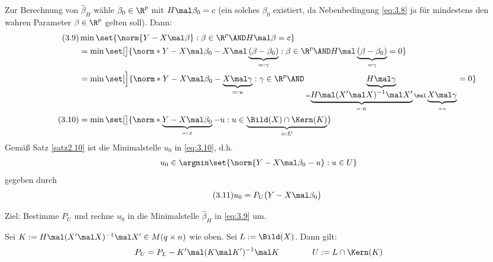 Zur Berechnung von $\hat{\beta}_H$ wähle $\beta_0\in\R^p$ mit $H\mal\beta_0=c$ (ein solches $\beta_0$ existiert, da Nebenbedingung \eqref{eq:3.8} ja für mindestens den wahren Parameter $\beta\in\R^p$ gelten soll).
Dann:
\begin{align}\label{eq:3.9}\tag{3.9}
	&\min\set{\norm{Y-X\mal\beta}:\beta\in\R^p\AND H\mal\beta=c}\\
	\nonumber
	&=\min\set[\big]{\norm*{Y-X\mal\beta_0-X\mal\underbrace{(\beta-\beta_0)}_{
		=:\gamma
	}}:\beta\in\R^p\AND H\mal\underbrace{(\beta-\beta_0)}_{
		=\gamma
	}=0}\\
	\nonumber
	&=\min\set[\Big]{\norm*{Y-X\mal\beta_0-\underbrace{X\mal \gamma}_{
		=:u
	}}:\gamma\in\R^p\AND \underbrace{H\mal\gamma}_{
		=\underbrace{H\mal(X'\mal X)^{-1}\mal X'}_{
			=:K
		}\mal \underbrace{X\mal\gamma}_{
			=u
		}
	}=0}\\
	\label{eq:3.10}\tag{3.10}
	&=\min\set[\big]{\norm*{\underbrace{Y-X\mal\beta_0}_{
		=:x
	}-u}:u\in\underbrace{\Bild(X)\cap\Kern(K)}_{
		=:U
	}}
\end{align}
Gemäß Satz \ref{satz2.10} ist die Minimalstelle $u_0$ in \eqref{eq:3.10}, d.h.
\begin{align*}
	u_0\in\argmin\set{\norm{Y-X\mal\beta_0-u}:u\in U}
\end{align*}
 gegeben durch
\begin{align}\label{eq:3.11}\tag{3.11}
	u_0=P_U\big(Y-X\mal\beta_0\big)
\end{align}

Ziel: Bestimme $P_U$ und rechne $u_0$ in die Minimalstelle $\hat{\beta}_H$ in \eqref{eq:3.9} um.

\begin{lemma}\label{lemma3.15}
	Sei $K:=H\mal(X'\mal X)^{-1}\mal X'\in M(q\times n)$ wie oben.
	Sei $L:=\Bild(X)$.
	Dann gilt:
	\begin{align*}
		P_U=P_L-K'\mal(K\mal K')^{-1}\mal K
		\qquad\mit\qquad
		U:=L\cap\Kern(K)
	\end{align*}
\end{lemma}


